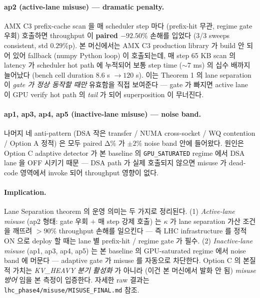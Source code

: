 {\paragraph{ap2 (active-lane misuse) — dramatic penalty.}
AMX C3 prefix-cache scan 을 매 scheduler step 마다 (prefix-hit 무관, regime
gate 우회) 호출하면 throughput 이 \textbf{paired $-92.50\%$ } 손해를 입었다
(3/3 sweeps consistent, std $0.29\%\!\textrm{p}$). 본 머신에서는 AMX C3
production library 가 build 안 되어 있어 fallback (numpy Python loop) 이
호출되는데, 매 step 65 KB scan 의 latency 가 scheduler hot path 에 누적되어
보통 step time (${\sim}\!7$ ms) 의 십수 배까지 늘어났다 (bench cell duration
$8.6$ s $\to 120$ s). 이는 Theorem 1 의 lane separation 이 \emph{gate 가
정상 동작할 때만} 유효함을 직접 보여준다 --- gate 가 빠지면 active lane
이 GPU verify hot path 의 \emph{tail} 가 되어 superposition 이 무너진다.

\paragraph{ap1, ap3, ap4, ap5 (inactive-lane misuse) — noise band.}
나머지 네 anti-pattern (DSA 작은 transfer / NUMA cross-socket / WQ contention /
Option A 정적) 은 모두 paired Δ\% 가 $\pm 2\%$ noise band 안에 들어왔다.
원인은 Option C adaptive detector 가 본 baseline 의 \texttt{GPU\_SATURATED}
regime 에서 DSA lane 을 OFF 시키기 때문 --- DSA path 가 실제 호출되지
않으면 misuse 가 dead-code 영역에서 invoke 되어 throughput 영향이 없다.

\paragraph{Implication.}
Lane Separation theorem 의 운영 의미는 두 가지로 정리된다.
(1) \emph{Active-lane misuse} (ap2 형태: gate 우회 $+$ 매 step 강제 호출) 는
$\kappa$ 가 lane separation 가산 조건을 깨뜨려 $\!>\!90\%$ throughput 손해를
일으킨다 --- 즉 LHC infrastructure 를 정적 ON 으로 deploy 할 때는 lane 별
prefix-hit / regime gate 가 필수.
(2) \emph{Inactive-lane misuse} (ap1, ap3, ap4, ap5) 는 본 baseline 의
GPU-saturated regime 에서 noise band 에 머문다 --- adaptive gate 가
misuse 를 자동으로 차단한다. Option C 의 본질적 가치는 \emph{KV\_HEAVY
분기 활성화} 가 아니라 (이건 본 머신에서 발화 안 됨) \emph{misuse 방어}
임을 본 측정이 입증한다. 자세한 raw 결과는
\texttt{lhc\_phase4/misuse/MISUSE\_FINAL.md} 참조.

}
